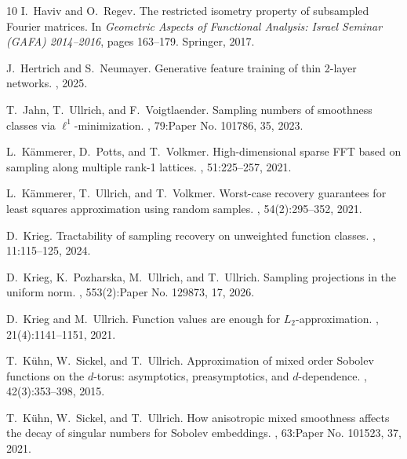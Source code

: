 \documentclass[11pt,reqno, a4paper]{article}
\numberwithin{equation}{section}
\begin{document}
\begin{thebibliography}{10}
I.~Haviv and O.~Regev.
\newblock The restricted isometry property of subsampled {F}ourier matrices.
\newblock In {\em Geometric Aspects of Functional Analysis: Israel Seminar
  (GAFA) 2014--2016}, pages 163--179. Springer, 2017.

J.~Hertrich and S.~Neumayer.
\newblock Generative feature training of thin 2-layer networks.
, 2025.

T.~Jahn, T.~Ullrich, and F.~Voigtlaender.
\newblock Sampling numbers of smoothness classes via \(\ell^1\)-minimization.
, 79:Paper No. 101786, 35, 2023.

L.~K\"ammerer, D.~Potts, and T.~Volkmer.
\newblock High-dimensional sparse {FFT} based on sampling along multiple rank-1
  lattices.
, 51:225--257, 2021.

L.~K\"ammerer, T.~Ullrich, and T.~Volkmer.
\newblock Worst-case recovery guarantees for least squares approximation using
  random samples.
, 54(2):295--352, 2021.

D.~Krieg.
\newblock Tractability of sampling recovery on unweighted function classes.
,
  11:115--125, 2024.

D.~Krieg, K.~Pozharska, M.~Ullrich, and T.~Ullrich.
\newblock Sampling projections in the uniform norm.
, 553(2):Paper
  No. 129873, 17, 2026.

D.~Krieg and M.~Ullrich.
\newblock Function values are enough for {$L_2$}-approximation.
, 21(4):1141--1151,
  2021.

T.~K\"{u}hn, W.~Sickel, and T.~Ullrich.
\newblock Approximation of mixed order {S}obolev functions on the {$d$}-torus:
  asymptotics, preasymptotics, and {$d$}-dependence.
, 42(3):353--398, 2015.

T.~K\"{u}hn, W.~Sickel, and T.~Ullrich.
\newblock How anisotropic mixed smoothness affects the decay of singular
  numbers for {S}obolev embeddings.
, 63:Paper No. 101523, 37, 2021.


\end{thebibliography}
\end{document}
